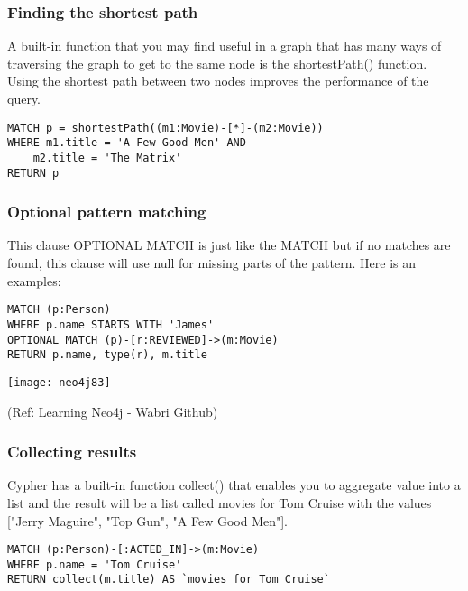 \begin{frame}[fragile]\frametitle{Finding the shortest path}

A built-in function that you may find useful in a graph that has many ways of traversing the graph to get to the same node is the shortestPath() function. Using the shortest path between two nodes improves the performance of the query.

\begin{lstlisting}
MATCH p = shortestPath((m1:Movie)-[*]-(m2:Movie))
WHERE m1.title = 'A Few Good Men' AND
    m2.title = 'The Matrix'
RETURN p
\end{lstlisting}

\end{frame}

\begin{frame}[fragile]\frametitle{Optional pattern matching}
This clause OPTIONAL MATCH is just like the MATCH but if no matches are found, this clause will use null for missing parts of the pattern. Here is an examples:

\begin{lstlisting}
MATCH (p:Person)
WHERE p.name STARTS WITH 'James'
OPTIONAL MATCH (p)-[r:REVIEWED]->(m:Movie)
RETURN p.name, type(r), m.title
\end{lstlisting}


\begin{center}
\texttt{[image: neo4j83]}
\end{center}	


{\tiny (Ref: Learning Neo4j - Wabri Github)}
\end{frame}

\begin{frame}[fragile]\frametitle{Collecting results }

Cypher has a built-in function collect() that enables you to aggregate value into a list and the result will be a list called movies for Tom Cruise with the values ["Jerry Maguire", "Top Gun", "A Few Good Men"].

\begin{lstlisting}
MATCH (p:Person)-[:ACTED_IN]->(m:Movie)
WHERE p.name = 'Tom Cruise'
RETURN collect(m.title) AS `movies for Tom Cruise`
\end{lstlisting}


\end{frame}

